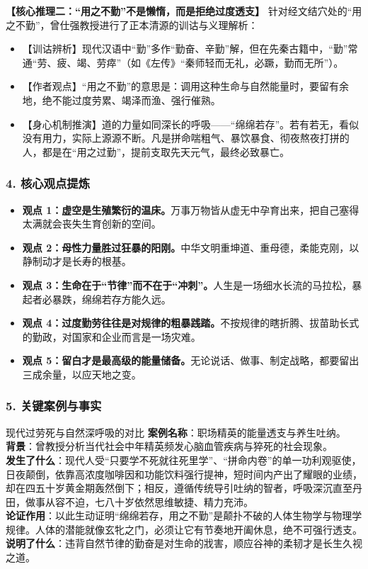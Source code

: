 \noindent\textbf{【核心推理二：“用之不勤”不是懒惰，而是拒绝过度透支】}
针对经文结穴处的“用之不勤”，曾仕强教授进行了正本清源的训诂与义理解析：
\begin{itemize}
    \item 【训诂辨析】现代汉语中“勤”多作“勤奋、辛勤”解，但在先秦古籍中，“勤”常通“劳、疲、竭、劳瘁”（如《左传》“秦师轻而无礼，必蹶，勤而无所”）。
    \item 【作者观点】“用之不勤”的意思是：调用这种生命与自然能量时，要留有余地，绝不能过度劳累、竭泽而渔、强行催熟。
    \item 【身心机制推演】道的力量如同深长的呼吸——“绵绵若存”。若有若无，看似没有用力，实际上源源不断。凡是拼命喘粗气、暴饮暴食、彻夜熬夜打拼的人，都是在“用之过勤”，提前支取先天元气，最终必致暴亡。
\end{itemize}

\subsubsection{4. 核心观点提炼}
\begin{itemize}
    \item \textbf{观点 1：虚空是生殖繁衍的温床。}万事万物皆从虚无中孕育出来，把自己塞得太满就会丧失生育创新的空间。
    \item \textbf{观点 2：母性力量胜过狂暴的阳刚。}中华文明重坤道、重母德，柔能克刚，以静制动才是长寿的根基。
    \item \textbf{观点 3：生命在于“节律”而不在于“冲刺”。}人生是一场细水长流的马拉松，暴起者必暴跌，绵绵若存方能久远。
    \item \textbf{观点 4：过度勤劳往往是对规律的粗暴践踏。}不按规律的瞎折腾、拔苗助长式的勤政，对国家和企业而言是一场灾难。
    \item \textbf{观点 5：留白才是最高级的能量储备。}无论说话、做事、制定战略，都要留出三成余量，以应天地之变。
\end{itemize}

\subsubsection{5. 关键案例与事实}
\begin{CaseBox}{现代过劳死与自然深呼吸的对比}
\textbf{案例名称}：职场精英的能量透支与养生吐纳。\\
\textbf{背景}：曾教授分析当代社会中年精英频发心脑血管疾病与猝死的社会现象。\\
\textbf{发生了什么}：现代人受“只要学不死就往死里学”、“拼命内卷”的单一功利观驱使，日夜颠倒，依靠高浓度咖啡因和功能饮料强行提神，短时间内产出了耀眼的业绩，却在四五十岁黄金期轰然倒下；相反，遵循传统导引吐纳的智者，呼吸深沉直至丹田，做事从容不迫，七八十岁依然思维敏捷、精力充沛。\\
\textbf{论证作用}：以此生动证明“绵绵若存，用之不勤”是颠扑不破的人体生物学与物理学规律。人体的潜能就像玄牝之门，必须让它有节奏地开阖休息，绝不可强行透支。\\
\textbf{说明了什么}：违背自然节律的勤奋是对生命的戕害，顺应谷神的柔韧才是长生久视之道。
\end{CaseBox}

